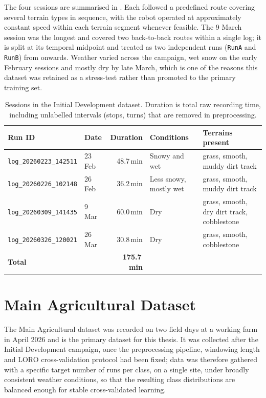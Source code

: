 The four sessions are summarised in . Each followed a predefined route covering several terrain types in sequence, with the robot operated at approximately constant speed within each terrain segment whenever feasible. The 9 March session was the longest and covered two back-to-back routes within a single log; it is split at its temporal midpoint and treated as two independent runs (\texttt{RunA} and \texttt{RunB}) from  onwards. Weather varied across the campaign, wet snow on the early February sessions and mostly dry by late March, which is one of the reasons this dataset was retained as a stress-test rather than promoted to the primary training set.

\begin{table}[H]
\centering
\caption{Sessions in the Initial Development dataset. Duration is total raw recording time, including unlabelled intervals (stops, turns) that are removed in preprocessing.}
\label{tab:main_sessions}
\begin{tabular}{llrp{3.0cm}p{3.0cm}}
\toprule
\textbf{Run ID} & \textbf{Date} & \textbf{Duration} & \textbf{Conditions} & \textbf{Terrains present} \\
\midrule
\texttt{log\_20260223\_142511} & 23 Feb & 48.7\,min & Snowy and wet & grass, smooth, muddy dirt track \\
\texttt{log\_20260226\_102148} & 26 Feb & 36.2\,min & Less snowy, mostly wet & grass, smooth, muddy dirt track \\
\texttt{log\_20260309\_141435} &  9 Mar & 60.0\,min & Dry & grass, smooth, dry dirt track, cobblestone \\
\texttt{log\_20260326\_120021} & 26 Mar & 30.8\,min & Dry & grass, smooth, cobblestone \\
\midrule
\multicolumn{2}{l}{\textbf{Total}} & \textbf{175.7\,min} & & \\
\bottomrule
\end{tabular}
\end{table}



\section{Main Agricultural Dataset}
\label{sec:farm_dataset}

The Main Agricultural dataset was recorded on two field days at a working farm in April 2026 and is the primary dataset for this thesis. It was collected after the Initial Development campaign, once the preprocessing pipeline, windowing length and LORO cross-validation protocol had been fixed; data was therefore gathered with a specific target number of runs per class, on a single site, under broadly consistent weather conditions, so that the resulting class distributions are balanced enough for stable cross-validated learning.

